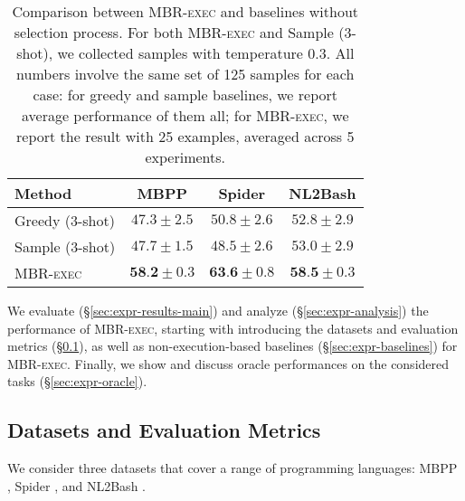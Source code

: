 \documentclass[11pt]{article}
\newcommand{\mbrexec}{\textsc{MBR-exec}\xspace}
\begin{document}
\begin{table}[t]
    \centering \small
    \begin{tabular}{lccc}
        \toprule
        \textbf{Method} & \textbf{MBPP} & \textbf{Spider} & \textbf{NL2Bash} \\
        \midrule
        Greedy (3-shot) &  $47.3\pm2.5$ \hspace{-6pt} & $50.8\pm2.6$ \hspace{-6pt}   & $52.8\pm2.9$ \\
        Sample (3-shot) &  $47.7\pm1.5$ \hspace{-6pt} & $48.5\pm2.6$ \hspace{-6pt}  &  $53.0\pm2.9$ \\
        \midrule 
        \mbrexec &  $\textbf{58.2}\pm0.3$ \hspace{-6pt} &  $\textbf{63.6}\pm 0.8$  \hspace{-6pt} &  $\textbf{58.5}\pm 0.3$ \\
        \bottomrule
    \end{tabular}
    \caption{Comparison between \mbrexec and baselines without selection process. For both \mbrexec and Sample (3-shot), we collected samples with temperature 0.3. All numbers involve the same set of 125 samples for each case: for greedy and sample baselines, we report average performance of them all; for \mbrexec, we report the result with 25 examples, averaged across 5 experiments. }
    \label{tab:main-results-basic-baseline}
\end{table}
 
We evaluate (\S\ref{sec:expr-results-main}) and analyze (\S\ref{sec:expr-analysis}) the performance of \mbrexec, starting with introducing the datasets and evaluation metrics (\S\ref{sec:expr-datasets}), as well as non-execution-based baselines (\S\ref{sec:expr-baselines}) for \mbrexec. Finally, we show and discuss oracle performances on the considered tasks (\S\ref{sec:expr-oracle}).
\subsection{Datasets and Evaluation Metrics}
\label{sec:expr-datasets}
We consider three datasets that cover a range of programming languages: MBPP \citep[Python;][]{austin2021program}, Spider \citep[SQL;][]{yu-etal-2018-spider}, and NL2Bash \citep[Bash;][]{lin-etal-2018-nl2bash}. 
\end{document}
